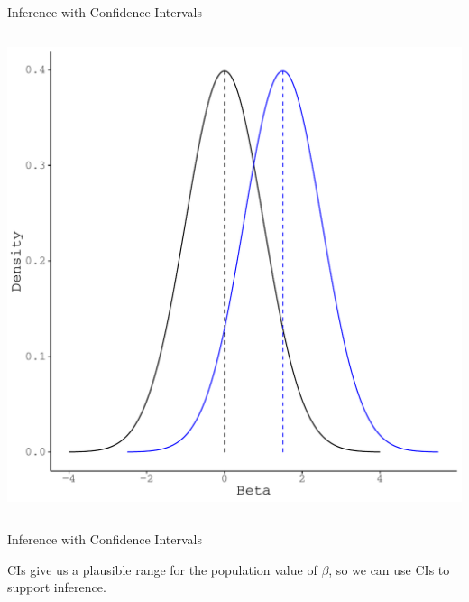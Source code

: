 \documentclass[10pt]{beamer}\usepackage[]{graphicx}\usepackage[]{color}
\makeatletter
\def\maxwidth{ %
  \ifdim\Gin@nat@width>\linewidth
    \linewidth
  \else
    \Gin@nat@width
  \fi
}
\newenvironment{knitrout}{}{} %
\makeatother
\begin{document}
{\begin{frame}{Inference with Confidence Intervals}
\begin{columns}
\begin{column}{0.5\textwidth}
\begin{knitrout}
{\centering \includegraphics[width=\maxwidth]{figure/unnamed-chunk-21-1} 

}


\end{knitrout}

\end{column}
\end{columns}

\end{frame}


\begin{frame}{Inference with Confidence Intervals}
  
  CIs give us a plausible range for the population value of $\beta$, so we can 
  use CIs to support inference.
  
\begin{columns}
  \begin{column}{0.5\textwidth}
    
\begin{knitrout}\footnotesize
{}\color{fgcolor}


\end{knitrout}
\end{column}
\end{columns}
\end{frame}}
\end{document}

